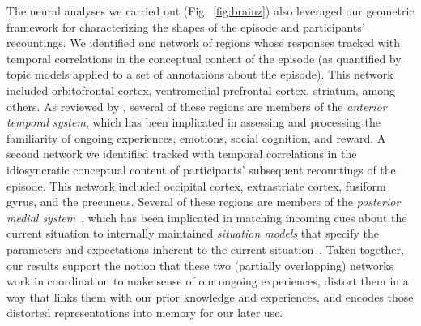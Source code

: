 \documentclass[10pt]{article}
\begin{document}
The neural analyses we carried out (Fig.~\ref{fig:brainz}) also leveraged our geometric framework for characterizing the shapes of the episode and participants' recountings.  We identified one network of regions whose responses tracked with temporal correlations in the conceptual content of the episode (as quantified by topic models applied to a set of annotations about the episode).  This network included orbitofrontal cortex, ventromedial prefrontal cortex, striatum, among others.  As reviewed by \cite{RangRitc12}, several of these regions are members of the \textit{anterior temporal system}, which has been implicated in assessing and processing the familiarity of ongoing experiences, emotions, social cognition, and reward.  A second network we identified tracked with temporal correlations in the idiosyncratic conceptual content of participants' subsequent recountings of the episode.  This network included occipital cortex, extrastriate cortex, fusiform gyrus, and the precuneus.  Several of these regions are members of the \textit{posterior medial system}~\citep{RangRitc12}, which has been implicated in matching incoming cues about the current situation to internally maintained \textit{situation models} that specify the parameters and expectations inherent to the current situation~\citep[also see][]{ZackEtal07, ZwaaRadv98}.  Taken together, our results support the notion that these two (partially overlapping) networks work in coordination to make sense of our ongoing experiences, distort them in a way that links them with our prior knowledge and experiences, and encodes those distorted representations into memory for our later use.
\end{document}
